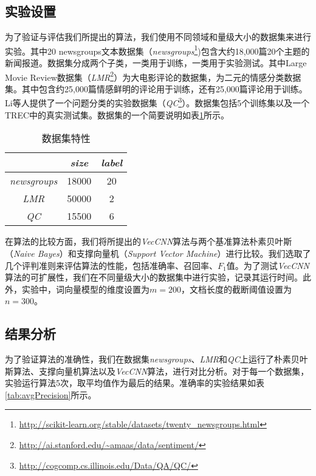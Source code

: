 \subsection{实验设置}
\label{subsec3:settings}
为了验证与评估我们所提出的算法，我们使用不同领域和量级大小的数据集来进行实验。其中20 newsgroups文本数据集（\textit{newsgroups}\footnote{\url{http://scikit-learn.org/stable/datasets/twenty_newsgroups.html}})包含大约18,000篇20个主题的新闻报道。数据集分成两个子类，一类用于训练，一类用于实验测试。其中Large Movie Review数据集（\textit{LMR}\footnote{\url{http://ai.stanford.edu/~amaas/data/sentiment/}}）为大电影评论的数据集，为二元的情感分类数据集。其中包含约25,000篇情感鲜明的评论用于训练，还有25,000篇评论用于训练。Li等人提供了一个问题分类的实验数据集（\textit{QC}\footnote{\url{http://cogcomp.cs.illinois.edu/Data/QA/QC/}}）。数据集包括5个训练集以及一个TREC中的真实测试集。数据集的一个简要说明如表\ref{tab:datasetCNN}所示。

\begin{table}
    \centering
    \caption{数据集特性}\label{tab:datasetCNN}
    \begin{tabular}{ccc}
        \hline
         & \textit{size} & \textit{label}\\
        \hline
        \textit{newsgroups} & 18000 & 20\\
        \hline
        \textit{LMR} & 50000 & 2\\
        \hline
        \textit{QC} & 15500 & 6\\
        \hline
    \end{tabular}
\end{table}

在算法的比较方面，我们将所提出的\textit{VecCNN}算法与两个基准算法朴素贝叶斯（\textit{Naive Bayes}）和支撑向量机（\textit{Support Vector Machine}）进行比较。我们选取了几个评判准则来评估算法的性能，包括准确率、召回率、$F_1$值。为了测试\textit{VecCNN}算法的可扩展性，我们在不同量级大小的数据集中进行实验，记录其运行时间。此外，实验中，词向量模型的维度设置为$m=200$，文档长度的截断阈值设置为$n=300$。

\subsection{结果分析}
\label{subsec3:analysis}
为了验证算法的准确性，我们在数据集\textit{newsgroups}、\textit{LMR}和\textit{QC}上运行了朴素贝叶斯算法、支撑向量机算法以及\textit{VecCNN}算法，进行对比分析。对于每一个数据集，实验运行算法5次，取平均值作为最后的结果。准确率的实验结果如表\ref{tab:avgPrecision}所示。

